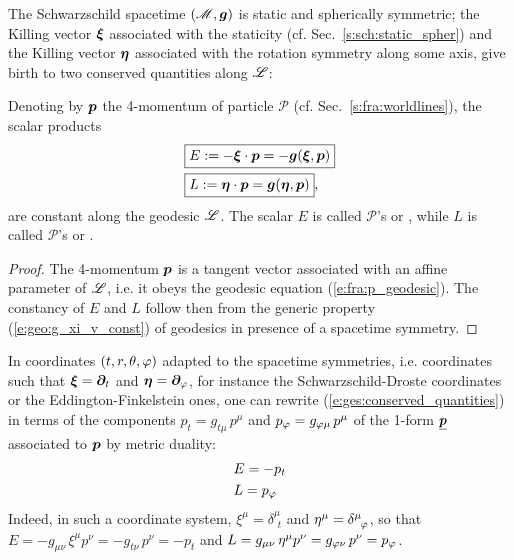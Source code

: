 The Schwarzschild spacetime $(\mathscr{M},\bm{g})$ is static and spherically symmetric; the
Killing vector $\bm{\xi}$ associated with the staticity (cf. Sec.~\ref{s:sch:static_spher})
and the Killing vector $\bm{\eta}$ associated with the rotation symmetry along some
axis, give birth to two conserved quantities along $\mathscr{L}$:
\begin{greybox}
Denoting by $\bm{p}$ the 4-momentum of particle
$\mathscr{P}$ (cf. Sec.~\ref{s:fra:worldlines}),
the scalar products
\begin{subequations}
\label{e:ges:conserved_quantities}
\begin{align}
& \fbox{$\displaystyle E := - \bm{\xi}\cdot \bm{p} = - \bm{g}(\bm{\xi},\bm{p}) $} \label{e:ges:conserved_energy} \\
& \fbox{$\displaystyle L := \bm{\eta}\cdot \bm{p} = \bm{g}(\bm{\eta},\bm{p}) $} , \label{e:ges:conserved_angu_mom}
\end{align}
\end{subequations}
are constant along the geodesic $\mathscr{L}$.
The scalar $E$ is called $\mathscr{P}$'s
or ,
while $L$ is called $\mathscr{P}$'s 
or .
\end{greybox}
\begin{proof}
The 4-momentum $\bm{p}$ is a tangent vector associated with an affine parameter
of $\mathscr{L}$, i.e. it obeys the geodesic equation (\ref{e:fra:p_geodesic}).
The constancy of $E$ and $L$ follow then from the generic property (\ref{e:geo:g_xi_v_const})
of geodesics in presence of a spacetime symmetry.
\end{proof}
In coordinates $(t,r,\theta,\varphi)$ adapted to the spacetime symmetries,
i.e. coordinates such that $\bm{\xi} = \bm{\partial}_t$ and $\bm{\eta}=\bm{\partial}_\varphi$,
for instance the Schwarzschild-Droste
coordinates or the Eddington-Finkelstein ones, one can rewrite
(\ref{e:ges:conserved_quantities})
in terms of the components $p_t = g_{t\mu} \, p^\mu$ and $p_\varphi = g_{\varphi\mu} \, p^\mu$
of the 1-form $\underline{\bm{p}}$ associated to $\bm{p}$ by metric duality:
\begin{subequations}
\begin{align}
& E = - p_t \\
& L = p_\varphi
\end{align}
\end{subequations}
Indeed, in such a coordinate system, $\xi^\mu =  \delta^\mu_{\ \, t}$
and $\eta^\mu = \delta^\mu_{\ \, \varphi}$, so that $E = -g_{\mu\nu} \, \xi^\mu p^\nu = -g_{t\nu} \, p^\nu = -p_t$
and $L = g_{\mu\nu} \, \eta^\mu p^\nu = g_{\varphi\nu} \, p^\nu = p_\varphi$.


